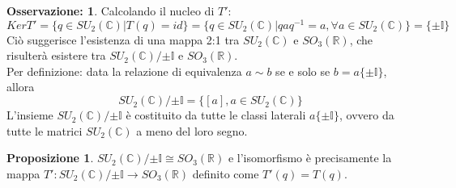\documentclass[12pt,a4paper]{report}
\theoremstyle{definition}
\theoremstyle{Theorem}
\newtheorem{Prop}[Def]{Proposizione}
\theoremstyle{definition}
\theoremstyle{definition}
\theoremstyle{definition}
\newtheorem{Obs}[Def]{Osservazione:}
\begin{document}
\begin{Obs} \label{Obs:3.2.3.1}
	Calcolando il nucleo di $T'$:$$KerT'=\{q\in SU_2(\mathbb{C})| T(q)=id\}=\{q\in SU_2(\mathbb{C})|qaq^{-1}=a, \forall a\in SU_2(\mathbb{C})\}=\{\pm\mathbb{I}\}$$
	Ciò suggerisce l'esistenza di una mappa 2:1 tra $SU_2(\mathbb{C})$ e $SO_3(\mathbb{R})$, che risulterà esistere tra $SU_2(\mathbb{C})/{\pm \mathbb{I}}$ e $SO_3(\mathbb{R})$.\\
	Per definizione: data la relazione di equivalenza $a\sim b$ se e solo se $b=a\{\pm \mathbb{I}\}$, allora
	$$SU_2(\mathbb{C})/{\pm \mathbb{I}}=\{[a], a\in SU_2(\mathbb{C})\}$$
	L'insieme $SU_2(\mathbb{C})/{\pm \mathbb{I}}$ è costituito da tutte le classi laterali $a\{\pm\mathbb{I}\}$, ovvero da tutte le matrici $SU_2(\mathbb{C})$ a meno del loro segno.
\end{Obs}
\begin{Prop} \label{prop:3.5.1}
	$SU_2(\mathbb{C})/{\pm \mathbb{I}}\cong SO_3(\mathbb{R})$ e l'isomorfismo è precisamente la mappa $T':SU_2(\mathbb{C})/{\pm \mathbb{I}}\longrightarrow SO_3(\mathbb{R})$ definito come $T'(q)=T(q)$.
\end{Prop}
\end{document}
